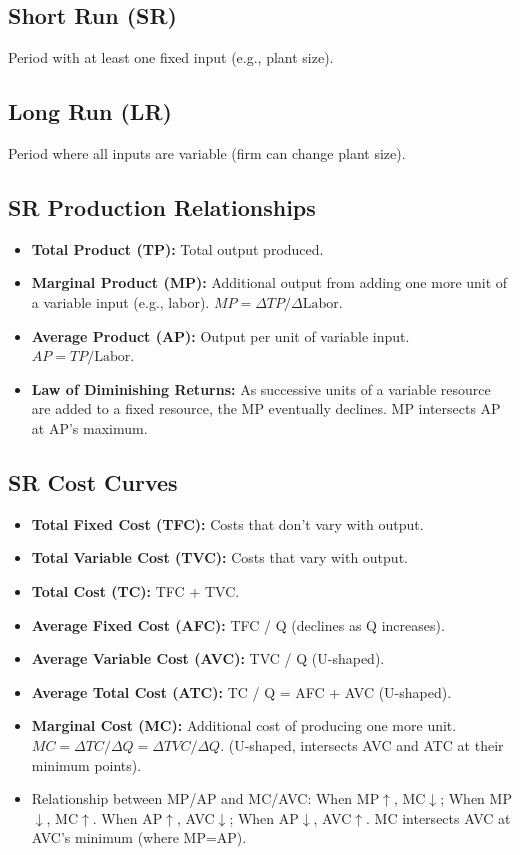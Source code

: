 \documentclass{article}
\begin{document}
\subsection*{Short Run (SR)}
Period with at least one fixed input (e.g., plant size).

\subsection*{Long Run (LR)}
Period where all inputs are variable (firm can change plant size).

\subsection*{SR Production Relationships}
\begin{itemize}
    \item \textbf{Total Product (TP):} Total output produced.
    \item \textbf{Marginal Product (MP):} Additional output from adding one more unit of a variable input (e.g., labor). $MP = \Delta TP / \Delta \text{Labor}$.
    \item \textbf{Average Product (AP):} Output per unit of variable input. $AP = TP / \text{Labor}$.
    \item \textbf{Law of Diminishing Returns:} As successive units of a variable resource are added to a fixed resource, the MP eventually declines. MP intersects AP at AP's maximum.
\end{itemize}

\subsection*{SR Cost Curves}
\begin{itemize}
    \item \textbf{Total Fixed Cost (TFC):} Costs that don't vary with output.
    \item \textbf{Total Variable Cost (TVC):} Costs that vary with output.
    \item \textbf{Total Cost (TC):} TFC + TVC.
    \item \textbf{Average Fixed Cost (AFC):} TFC / Q (declines as Q increases).
    \item \textbf{Average Variable Cost (AVC):} TVC / Q (U-shaped).
    \item \textbf{Average Total Cost (ATC):} TC / Q = AFC + AVC (U-shaped).
    \item \textbf{Marginal Cost (MC):} Additional cost of producing one more unit. $MC = \Delta TC / \Delta Q = \Delta TVC / \Delta Q$. (U-shaped, intersects AVC and ATC at their minimum points).
    \item Relationship between MP/AP and MC/AVC: When MP$\uparrow$, MC$\downarrow$; When MP$\downarrow$, MC$\uparrow$. When AP$\uparrow$, AVC$\downarrow$; When AP$\downarrow$, AVC$\uparrow$. MC intersects AVC at AVC's minimum (where MP=AP).
\end{itemize}
\end{document}
